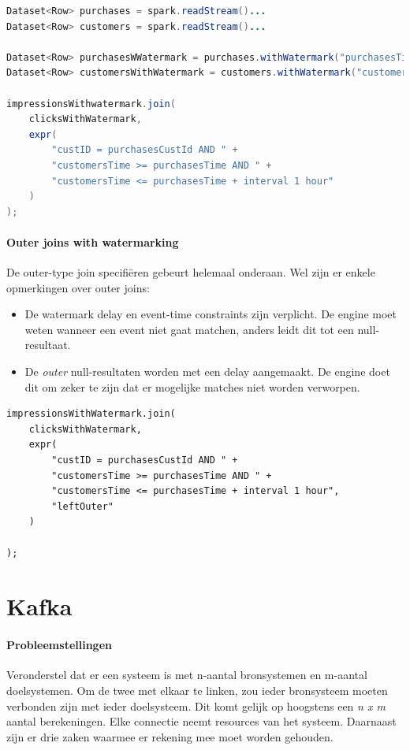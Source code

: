 \documentclass[a4paper,10pt,twoside]{report}
\begin{document}
\begin{lstlisting}[language=Java]
Dataset<Row> purchases = spark.readStream()...
Dataset<Row> customers = spark.readStream()...

Dataset<Row> purchasesWWatermark = purchases.withWatermark("purchasesTime","2 hours");
Dataset<Row> customersWithWatermark = customers.withWatermark("customersTime", "3 hours");

impressionsWithwatermark.join(
	clicksWithWatermark,
	expr(
		"custID = purchasesCustId AND " +
		"customersTime >= purchasesTime AND " +
		"customersTime <= purchasesTime + interval 1 hour"
	)
);
\end{lstlisting}

\subsubsection{Outer joins with watermarking}

De outer-type join specifiëren gebeurt helemaal onderaan. Wel zijn er enkele opmerkingen over outer joins:
\begin{itemize}
	\item De watermark delay en event-time constraints zijn verplicht. De engine moet weten wanneer een event niet gaat matchen, anders leidt dit tot een null-resultaat.
	\item De \textit{outer} null-resultaten worden met een delay aangemaakt. De engine doet dit om zeker te zijn dat er mogelijke matches niet worden verworpen.
\end{itemize}

\begin{lstlisting}
impressionsWithWatermark.join(
	clicksWithWatermark,
	expr(
		"custID = purchasesCustId AND " +
		"customersTime >= purchasesTime AND " +
		"customersTime <= purchasesTime + interval 1 hour",
		"leftOuter"
	)

);
\end{lstlisting}

\chapter{Kafka}

\subsubsection{Probleemstellingen}

Veronderstel dat er een systeem is met n-aantal bronsystemen en m-aantal doelsystemen. Om de twee met elkaar te linken, zou ieder bronsysteem moeten verbonden zijn met ieder doelsysteem. Dit komt gelijk op hoogstens een \textit{n x m} aantal berekeningen. Elke connectie neemt resources van het systeem. Daarnaast zijn er drie zaken waarmee er rekening mee moet worden gehouden.
\end{document}
